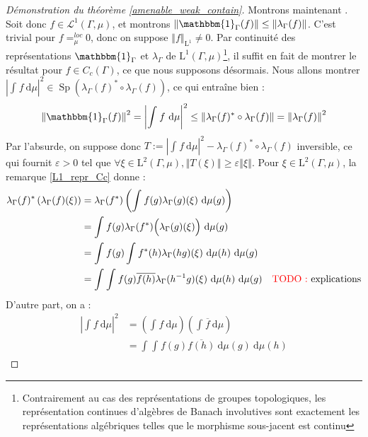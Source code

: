 \documentclass[a4paper,12pt]{article}
\newcommand{\norm}[1]{\left\Vert #1\right\Vert}
\newcommand{\abs}[1]{\left\vert#1\right\vert}
\newcommand{\indic}{\mathbbm{1}}
\newcommand{\integral}[4]{\int_{#1}^{#2} #3~\mathrm{d}#4}
\newcommand{\inv}{^{-1}}
\newcommand{\comp}{\circ}
\renewcommand{\implies}{\Rightarrow}
\newcommand{\TODO}[1]{{\color{red}TODO :} #1}
\DeclareMathOperator{\Sp}{Sp}
\begin{document}
\begin{proof}[Démonstration du théorème \ref{amenable_weak_contain}]
    Montrons maintenant \framebox{$(\ref{amenable_weak_contain/strong_almost_invariant})\implies(\ref{amenable_weak_contain/weak_contain})$}. Soit donc $f\in\mathscr{L}^1(\Gamma, \mu)$,
    et montrons $\norm{\indic_\Gamma(f)}\le\norm{\lambda_\Gamma(f)}$. C'est trivial pour $f=_\mu^{loc} 0$, donc on suppose $\norm{f}_{\mathrm{L}^1}\ne0$. Par continuité des représentations $\indic_\Gamma$ et 
    $\lambda_\Gamma$ de $\mathrm{L}^1(\Gamma, \mu)$\footnote{Contrairement au cas des représentations de groupes topologiques, 
    les représentation continues d'algèbres de Banach involutives sont exactement les représentations algébriques telles que le 
    morphisme sous-jacent est continu}, il suffit en fait de montrer le résultat pour $f\in C_c(\Gamma)$, ce que nous supposons désormais.
    Nous allons montrer $\abs{\integral{}{}{f}{\mu}}^2\in\Sp\left(\lambda_\Gamma(f)^*\comp \lambda_\Gamma(f)\right)$, ce qui entraîne bien :
    \begin{equation*}
        \norm{\indic_\Gamma(f)}^2=\abs{\integral{}{}{f}{\mu}}^2\le\norm{\lambda_\Gamma(f)^*\comp \lambda_\Gamma(f)} = \norm{\lambda_\Gamma(f)}^2
    \end{equation*}
    Par l'absurde, on suppose donc $T := \abs{\integral{}{}{f}{\mu}}^2 - \lambda_\Gamma(f)^*\comp \lambda_\Gamma(f)$ inversible, ce qui fournit $\varepsilon>0$
    tel que $\forall\xi\in\mathrm{L}^2(\Gamma, \mu), \norm{T(\xi)}\ge\varepsilon\norm{\xi}$.
    Pour $\xi\in\mathrm{L}^2(\Gamma, \mu)$, la remarque \ref{L1_repr_Cc} donne :
    \begin{align*}
        \lambda_\Gamma(f)^*\left(\lambda_\Gamma(f)(\xi)\right) 
            &= \lambda_\Gamma(f^*)\left(\integral{}{}{f(g)\lambda_\Gamma(g)(\xi)}{\mu(g)}\right) \\
            &= \integral{}{}{f(g)\lambda_\Gamma(f^*)\Big(\lambda_\Gamma(g)(\xi)\Big)}{\mu(g)} \\
            &= \integral{}{}{f(g)\integral{}{}{f^*(h)\lambda_\Gamma(hg)(\xi)}{\mu(h)}}{\mu(g)} \\
            &= \integral{}{}{\integral{}{}{f(g)\overline{f(h)}\lambda_\Gamma(h\inv g)(\xi)}{\mu(h)}}{\mu(g)}\quad\text{\TODO{explications}}
    \end{align*} 
    D'autre part, on a :
    \begin{align*}
        \abs{\integral{}{}{f}{\mu}}^2 
            &= \left(\integral{}{}{f}{\mu}\right)\left(\integral{}{}{\overline{f}}{\mu}\right) \\
            &= \integral{}{}{\integral{}{}{f(g)\overline{f(h)}}{\mu(g)}}{\mu(h)}

\end{align*}
\end{proof}
\end{document}
